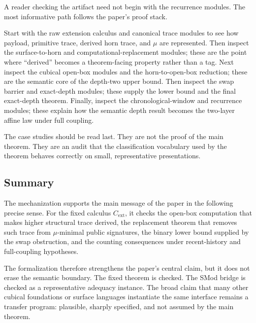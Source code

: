 A reader checking the artifact need not begin with the recurrence modules.  The most informative
path follows the paper's proof stack.

Start with the raw extension calculus and canonical trace modules to see how payload, primitive
trace, derived horn trace, and \(\mu\) are represented.  Then inspect the surface-to-horn and
computational-replacement modules; these are the point where ``derived'' becomes a theorem-facing
property rather than a tag.  Next inspect the cubical open-box modules and the horn-to-open-box
reduction; these are the semantic core of the depth-two upper bound.  Then inspect the swap
barrier and exact-depth modules; these supply the lower bound and the final exact-depth theorem.
Finally, inspect the chronological-window and recurrence modules; these explain how the semantic
depth result becomes the two-layer affine law under full coupling.

The case studies should be read last.  They are not the proof of the main theorem.  They are an
audit that the classification vocabulary used by the theorem behaves correctly on small,
representative presentations.

\subsection{Summary}
\label{subsec:mechanization-summary}

The mechanization supports the main message of the paper in the following precise sense.  For
the fixed calculus \(C_{\mathrm{ext}}\), it checks the open-box computation that makes higher
structural trace derived, the replacement theorem that removes such trace from
\(\mu\)-minimal public signatures, the binary lower bound supplied by the swap obstruction, and
the counting consequences under recent-history and full-coupling hypotheses.

The formalization therefore strengthens the paper's central claim, but it does not erase the
semantic boundary.  The fixed theorem is checked.  The SMod bridge is checked as a representative
adequacy instance.  The broad claim that many other cubical foundations or surface languages
instantiate the same interface remains a transfer program: plausible, sharply specified, and
not assumed by the main theorem.

